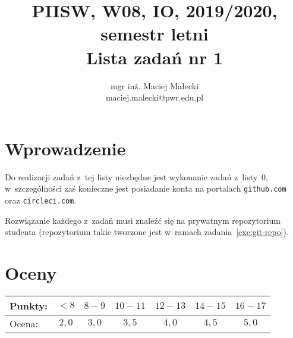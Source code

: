 \documentclass[12pt]{article}
\title{PIISW, W08, IO, 2019/2020, semestr letni\\Lista zadań nr 1}
\author{mgr inż. Maciej Małecki\\ \small maciej.malecki@pwr.edu.pl}
\begin{document}
    \maketitle

    \section*{Wprowadzenie}
        Do realizacji zadań z~tej listy niezbędne jest wykonanie zadań z~listy~0, w~szczególności zaś konieczne jest posiadanie konta na portalach \texttt{github.com} oraz \texttt{circleci.com}.

        Rozwiązanie każdego z~zadań musi znaleźć się na prywatnym repozytorium studenta (repozytorium takie tworzone jest w~ramach zadania~\ref{exc:git-repo}).

    \section*{Oceny}
    \begin{tabular}{|l|c|c|c|c|c|c|}
        \hline
        Punkty: & $<8$ & $8-9$ & $10-11$ & $12-13$ & $14-15$ & $16-17$\\
        \hline
        Ocena:  & $2,0$ & $3,0$ & $3,5$ & $4,0$ & $4,5$ & $5,0$\\
        \hline
    \end{tabular}
\end{document}
